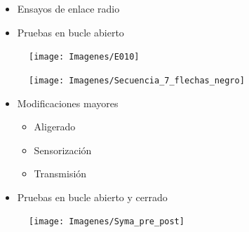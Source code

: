 \documentclass[a4,landscpae]{seminar}
\begin{document}
\begin{hslide}
\begin{minipage}{20cm}
	\begin{minipage}{5.2cm}
		\begin{itemize}
			\item Ensayos de enlace radio
			\item Pruebas en bucle abierto
		\end{itemize}
	\end{minipage}
	\begin{minipage}{6cm}
		\begin{figure}
			\texttt{[image: Imagenes/E010]}
		\end{figure}
	\end{minipage}
\end{minipage} \vfill
\begin{minipage}{2cm}
	\begin{center}
		\begin{figure}
			\texttt{[image: Imagenes/Secuencia\_7\_flechas\_negro]}
		\end{figure}
	\end{center}
\end{minipage} \vfill
\end{hslide}
\begin{hslide}
\begin{minipage}{20cm}
	\begin{minipage}{7.2cm}
		\begin{itemize}
			\item Modificaciones mayores
				\begin{itemize}
					\item Aligerado
					\item Sensorizaci\'on
					\item Transmisi\'on
				\end{itemize}
			\item Pruebas en bucle abierto y cerrado
		\end{itemize}
	\end{minipage}
\end{minipage} \hfill
\begin{minipage}{3cm}
	\begin{center}
		\begin{figure}
			\texttt{[image: Imagenes/Syma\_pre\_post]}
		\end{figure}
	\end{center}
\end{minipage} \vfill
\end{hslide}
\end{document}
